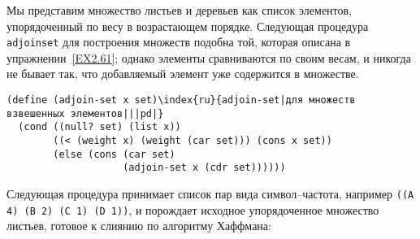 Мы представим множество листьев и деревьев как список
элементов, упорядоченный по весу в возрастающем порядке.  Следующая
процедура {\tt adjoin\-set} для построения множеств подобна той,
которая описана в упражнении~\ref{EX2.61}; однако элементы
сравниваются по своим весам, и никогда не бывает так, что добавляемый
элемент уже содержится в множестве.

\begin{Verbatim}[fontsize=\small]
(define (adjoin-set x set)\index{ru}{adjoin-set|для множеств взвешенных элементов|||pd|}
  (cond ((null? set) (list x))
        ((< (weight x) (weight (car set))) (cons x set))
        (else (cons (car set)
                    (adjoin-set x (cdr set))))))
\end{Verbatim}

Следующая процедура принимает список пар вида
символ--частота, например {\tt ((A 4) (B 2) (C 1) (D 1))}, и
порождает исходное упорядоченное множество листьев, готовое к слиянию
по алгоритму Хаффмана:

